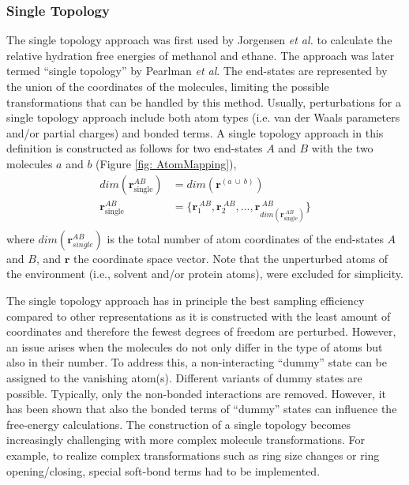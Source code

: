 \subsubsection{Single Topology}
The single topology approach was first used by Jorgensen \textit{et al.}\cite{Jorgensen1985} to calculate the relative hydration free energies of methanol and ethane. The approach was later termed ``single topology'' by Pearlman \textit{et al}.\cite{Pearlman1991}
The end-states are represented by the union of the coordinates of the molecules, limiting the possible transformations that can be handled by this method. Usually, perturbations for a single topology approach include both atom types (i.e. van der Waals parameters and/or partial charges) and bonded terms.\cite{Jorgensen1985, Pearlman1991, Pearlman1994, Boresch1999, Boresch1999B, Donnini2011, Donnini2016, Wang2015,  Liu2015, Wang2017, Damodaran2001}
%
A single topology approach in this definition is constructed as follows for two end-states $A$ and $B$ with the two molecules $a$ and $b$ (Figure \ref{fig: AtomMapping}),
\begin{align*}
dim(\textbf{r}_{\text{single}}^{AB}) &= dim(\textbf{r}^{(a~\cup~b)}) \\
    \textbf{r}^{AB}_{\text{single}} &= \{\textbf{r}^{~AB}_{1}, \textbf{r}^{~AB}_{2}, ..., \textbf{r}^{~AB}_{dim(\textbf{r}_{\text{single}}^{~AB})}\}\\
\end{align*}
where $dim(\textbf{r}_{single}^{AB})$ is the total number of atom coordinates of the end-states $A$ and $B$, and $\textbf{r}$ the coordinate space vector. Note that the unperturbed atoms of the environment (i.e., solvent and/or protein atoms), were excluded for simplicity.

The single topology approach has in principle the best sampling efficiency compared to other representations as it is constructed with the least amount of coordinates and therefore the fewest degrees of freedom are perturbed.\cite{Pearlman1994, Donnini2011, Yu2017, Fleck2021}
However, an issue arises when the molecules do not only differ in the type of atoms but also in their number. To address this, a non-interacting ``dummy'' state can be assigned to the vanishing atom(s).\cite{Pearlman1994, Donnini2011, Yu2017, Fleck2021}
Different variants of dummy states are possible. Typically, only the non-bonded interactions are removed. However, it has been shown that also the bonded terms of ``dummy'' states can influence the free-energy calculations.\cite{Fleck2021}
The construction of a single topology becomes increasingly challenging with more complex molecule transformations.
For example, to realize complex transformations such as ring size changes or ring opening/closing, special soft-bond terms had to be implemented.\cite{Wang2017} 


